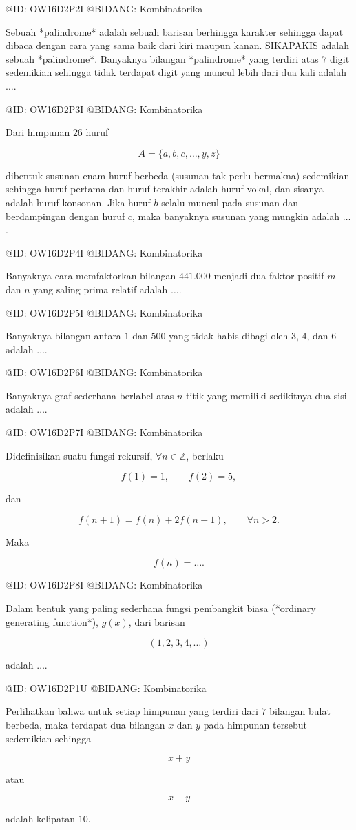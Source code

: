 @ID: OW16D2P2I
@BIDANG: Kombinatorika

Sebuah *palindrome* adalah sebuah barisan berhingga karakter sehingga dapat dibaca dengan cara yang sama baik dari kiri maupun kanan. SIKAPAKIS adalah sebuah *palindrome*. Banyaknya bilangan *palindrome* yang terdiri atas $7$ digit sedemikian sehingga tidak terdapat digit yang muncul lebih dari dua kali adalah $\ldots$.

@ID: OW16D2P3I
@BIDANG: Kombinatorika

Dari himpunan $26$ huruf

$$
A=\{a,b,c,\ldots,y,z\}
$$

dibentuk susunan enam huruf berbeda (susunan tak perlu bermakna) sedemikian sehingga huruf pertama dan huruf terakhir adalah huruf vokal, dan sisanya adalah huruf konsonan. Jika huruf $b$ selalu muncul pada susunan dan berdampingan dengan huruf $c$, maka banyaknya susunan yang mungkin adalah $\ldots$.

@ID: OW16D2P4I
@BIDANG: Kombinatorika

Banyaknya cara memfaktorkan bilangan $441.000$ menjadi dua faktor positif $m$ dan $n$ yang saling prima relatif adalah $\ldots$.

@ID: OW16D2P5I
@BIDANG: Kombinatorika

Banyaknya bilangan antara $1$ dan $500$ yang tidak habis dibagi oleh $3$, $4$, dan $6$ adalah $\ldots$.

@ID: OW16D2P6I
@BIDANG: Kombinatorika

Banyaknya graf sederhana berlabel atas $n$ titik yang memiliki sedikitnya dua sisi adalah $\ldots$.

@ID: OW16D2P7I
@BIDANG: Kombinatorika

Didefinisikan suatu fungsi rekursif, $\forall n\in\mathbb Z$, berlaku

$$
f(1)=1,\qquad
f(2)=5,
$$

dan

$$
f(n+1)=f(n)+2f(n-1),\qquad \forall n>2.
$$

Maka

$$
f(n)=\ldots.
$$

@ID: OW16D2P8I
@BIDANG: Kombinatorika

Dalam bentuk yang paling sederhana fungsi pembangkit biasa (*ordinary generating function*), $g(x)$, dari barisan

$$
(1,2,3,4,\ldots)
$$

adalah $\ldots$.

@ID: OW16D2P1U
@BIDANG: Kombinatorika

Perlihatkan bahwa untuk setiap himpunan yang terdiri dari $7$ bilangan bulat berbeda, maka terdapat dua bilangan $x$ dan $y$ pada himpunan tersebut sedemikian sehingga

$$
x+y
$$

atau

$$
x-y
$$

adalah kelipatan $10$.



